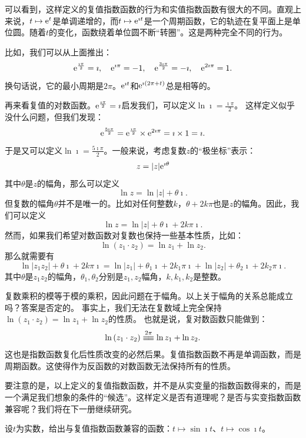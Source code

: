\documentclass[12pt,UTF8]{ctexbook}
\begin{document}
可以看到，这样定义的复值指数函数的行为和实值指数函数有很大的不同。直观上来说，$t\mapsto \mathrm{e}^{t}$是单调递增的，而$t\mapsto \mathrm{e}^{\imath t}$是一个周期函数，它的轨迹在复平面上是单位圆。随着$t$的变化，函数绕着单位圆不断“转圈”。这是两种完全不同的行为。

比如，我们可以从上面推出：
$$ \mathrm{e}^{\frac{\imath\pi}{2}} = \imath, \quad \mathrm{e}^{\imath\pi} = -1, \quad \mathrm{e}^{\frac{3\imath\pi}{2}} = -\imath, \quad \mathrm{e}^{2\imath\pi} = 1. $$
换句话说，它的最小周期是$2\pi$。$\mathrm{e}^{\imath t}$和$\mathrm{e}^{\imath(2\pi + t)}$总是相等的。

再来看复值的对数函数。$\mathrm{e}^{\frac{\imath\pi}{2}} = \imath$启发我们，可以定义$\ln{\imath} = \frac{\imath\pi}{2}$。
这样定义似乎没什么问题，但我们发现：
$$ \mathrm{e}^{\frac{5\imath\pi}{2}} = \mathrm{e}^{\frac{\imath\pi}{2}} \times \mathrm{e}^{2\imath\pi} = \imath \times 1 = \imath. $$
于是又可以定义$\ln{\imath} = \frac{5\imath\pi}{2}$。一般来说，考虑复数$z$的“极坐标”表示：
$$ z = |z| \mathrm{e}^{\imath \theta}$$
其中$\theta$是$z$的幅角，那么可以定义
$$\ln{z} = \ln{|z|} + \theta \imath.$$
但复数的幅角$\theta$并不是唯一的。比如对任何整数$k$，$\theta + 2k\pi$也是$z$的幅角。因此，我们可以定义
$$\ln{z} = \ln{|z|} + \theta \imath + 2k\pi\imath.$$
然而，如果我们希望对数函数对复数也保持一些基本性质，比如：
$$ \ln{(z_1 \cdot z_2)} = \ln{z_1} + \ln{z_2}. $$
那么就需要有
$$ \ln{|z_1z_2|} + \theta \imath + 2k\pi\imath = \ln{|z_1|} + \theta_1 \imath + 2k_1\pi\imath + \ln{|z_2|} + \theta_2 \imath + 2k_2\pi\imath.$$
其中$\theta$是$z_1z_2$的幅角，$\theta_1, \theta_2$分别是$z_1, z_2$幅角，$k, k_1, k_2$是整数。

复数乘积的模等于模的乘积，因此问题在于幅角。以上关于幅角的关系总能成立吗？答案是否定的。
事实上，我们无法在复数域上完全保持$\ln{(z_1 \cdot z_2)} = \ln{z_1} + \ln{z_2}$的性质。
也就是说，复对数函数只能做到：
$$ \ln{(z_1 \cdot z_2)} \tong{2\pi} \ln{z_1} + \ln{z_2} . $$
这也是指数函数复化后性质改变的必然后果。复值指数函数不再是单调函数，而是周期函数。这使得作为反函数的对数函数无法保持所有的性质。

要注意的是，以上定义的复值指数函数，并不是从实变量的指数函数得来的，而是一个满足我们想象的条件的“候选”。这样定义是否有道理呢？是否与实变指数函数兼容呢？我们将在下一册继续研究。

\begin{et}
    设$t$为实数，给出与复值指数函数兼容的函数：$t\mapsto \sin{\imath t}$、$t\mapsto \cos{\imath t}$。
\end{et}
\end{document}
